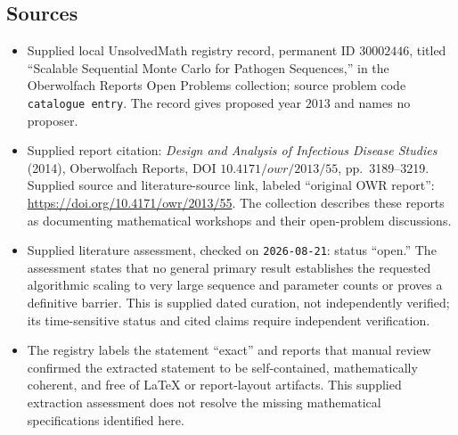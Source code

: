 \documentclass[11pt]{article}
\begin{document}
\subsection{Sources}
\begin{itemize}
\item Supplied local UnsolvedMath registry record, permanent ID \(30002446\), titled ``Scalable Sequential Monte Carlo for Pathogen Sequences,'' in the Oberwolfach Reports Open Problems collection; source problem code \texttt{catalogue entry}. The record gives proposed year \(2013\) and names no proposer.
\item Supplied report citation: \emph{Design and Analysis of Infectious Disease Studies} (2014), Oberwolfach Reports, DOI \(10.4171/owr/2013/55\), pp.\ 3189--3219. Supplied source and literature-source link, labeled ``original OWR report'': \url{https://doi.org/10.4171/owr/2013/55}. The collection describes these reports as documenting mathematical workshops and their open-problem discussions.
\item Supplied literature assessment, checked on \texttt{2026-08-21}: status ``open.'' The assessment states that no general primary result establishes the requested algorithmic scaling to very large sequence and parameter counts or proves a definitive barrier. This is supplied dated curation, not independently verified; its time-sensitive status and cited claims require independent verification.
\item The registry labels the statement ``exact'' and reports that manual review confirmed the extracted statement to be self-contained, mathematically coherent, and free of LaTeX or report-layout artifacts. This supplied extraction assessment does not resolve the missing mathematical specifications identified here.
\end{itemize}
\end{document}
